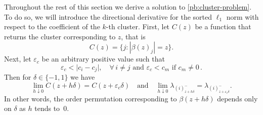 Throughout the rest of this section we derive a  solution to \eqref{pb:cluster-problem}.
To do so, we will introduce the directional derivative for the
sorted \(\ell_1\) norm with respect to the coefficient of the \(k\)-th cluster.
First, let \(C(z)\) be a function that returns the cluster corresponding to \(z\), that is
\[
  C(z) = \{j : |\beta(z)_j| = z\}.
\]
Next, let $\varepsilon_c$ be an arbitrary positive value such that
\begin{equation}
  \label{eq:epsilon-c}
  \varepsilon_c < \big| c_i - c_j\big| , \quad \forall\, i \neq j \text{ and } \varepsilon_c < c_m \text{ if } c_m \neq 0 \, .
\end{equation}
Then for \(\delta \in \{-1, 1\}\) we have
\begin{equation}
  \lim_{h \downarrow 0} C(z + h\delta) = C(z + {\varepsilon_c} \delta)
  \quad\text{and}\quad
  \lim_{h \downarrow 0} \lambda_{(i)^-_{z + h\delta}}
  = \lambda_{(i)^-_{z + {\varepsilon_c}\delta}}.
\end{equation}
In other words, the order permutation corresponding to \(\beta(z + h\delta)\)
depends only on \(\delta\) as \(h\) tends to~\(0\).

